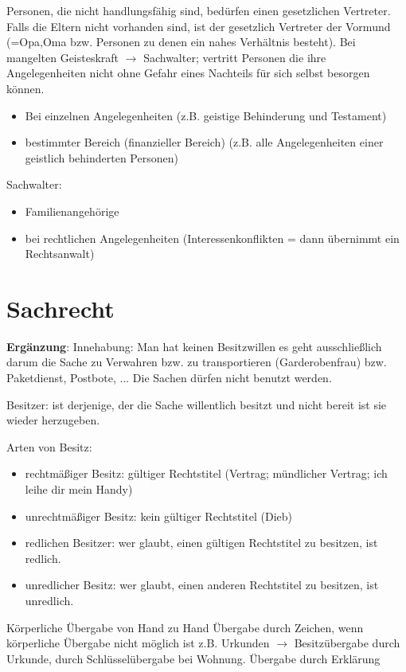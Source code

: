 \documentclass[a4paper]{report}
\begin{document}
Personen, die nicht handlungsfähig sind, bedürfen einen gesetzlichen Vertreter. Falls die Eltern nicht vorhanden sind, ist der gesetzlich Vertreter der Vormund (=Opa,Oma bzw. Personen zu denen ein nahes Verhältnis besteht). Bei mangelten Geisteskraft $\rightarrow$ Sachwalter; vertritt Personen die ihre Angelegenheiten nicht ohne Gefahr eines Nachteils für sich selbst besorgen können. 
\begin{itemize}
\item Bei einzelnen Angelegenheiten (z.B. geistige Behinderung und Testament)
\item bestimmter Bereich (finanzieller Bereich) (z.B. alle Angelegenheiten einer geistlich behinderten Personen)
\end{itemize}

Sachwalter:

\begin{itemize}
\item Familienangehörige
\item bei rechtlichen Angelegenheiten (Interessenkonflikten = dann übernimmt ein Rechtsanwalt)
\end{itemize}

\section{Sachrecht}


\textbf{Ergänzung}: Innehabung: Man hat keinen Besitzwillen es geht ausschließlich darum die Sache zu Verwahren bzw. zu transportieren (Garderobenfrau) bzw. Paketdienst, Postbote, ... Die Sachen dürfen nicht benutzt werden.

Besitzer: ist derjenige, der die Sache willentlich besitzt und nicht bereit ist sie wieder herzugeben.

Arten von Besitz:

\begin{itemize}
\item rechtmäßiger Besitz: gültiger Rechtstitel (Vertrag; mündlicher Vertrag; ich leihe dir mein Handy)
\item unrechtmäßiger Besitz: kein gültiger Rechtstitel (Dieb)
\item redlichen Besitzer: wer glaubt, einen gültigen Rechtstitel zu besitzen, ist redlich.
\item unredlicher Besitz: wer glaubt, einen anderen Rechtstitel zu besitzen, ist 
unredlich.
\end{itemize}

Körperliche Übergabe von Hand zu Hand
Übergabe durch Zeichen, wenn körperliche Übergabe nicht möglich ist z.B. Urkunden $\rightarrow$ Besitzübergabe durch Urkunde, durch Schlüsselübergabe bei Wohnung.
Übergabe durch Erklärung
\end{document}
